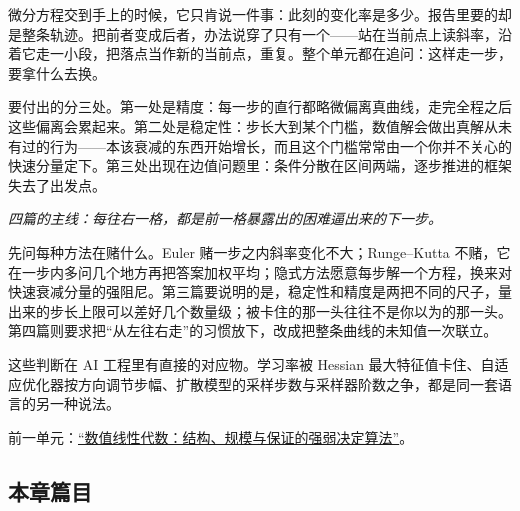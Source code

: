 微分方程交到手上的时候，它只肯说一件事：此刻的变化率是多少。报告里要的却是整条轨迹。把前者变成后者，办法说穿了只有一个——站在当前点上读斜率，沿着它走一小段，把落点当作新的当前点，重复。整个单元都在追问：这样走一步，要拿什么去换。

要付出的分三处。第一处是精度：每一步的直行都略微偏离真曲线，走完全程之后这些偏离会累起来。第二处是稳定性：步长大到某个门槛，数值解会做出真解从未有过的行为——本该衰减的东西开始增长，而且这个门槛常常由一个你并不关心的快速分量定下。第三处出现在边值问题里：条件分散在区间两端，逐步推进的框架失去了出发点。

\begin{center}

\emph{四篇的主线：每往右一格，都是前一格暴露出的困难逼出来的下一步。}
\end{center}

先问每种方法在赌什么。Euler 赌一步之内斜率变化不大；Runge--Kutta 不赌，它在一步内多问几个地方再把答案加权平均；隐式方法愿意每步解一个方程，换来对快速衰减分量的强阻尼。第三篇要说明的是，稳定性和精度是两把不同的尺子，量出来的步长上限可以差好几个数量级；被卡住的那一头往往不是你以为的那一头。第四篇则要求把``从左往右走''的习惯放下，改成把整条曲线的未知值一次联立。

这些判断在 AI 工程里有直接的对应物。学习率被 Hessian 最大特征值卡住、自适应优化器按方向调节步幅、扩散模型的采样步数与采样器阶数之争，都是同一套语言的另一种说法。

前一单元：\hyperref[ch:065]{``数值线性代数：结构、规模与保证的强弱决定算法''}。

\subsection{本章篇目}

